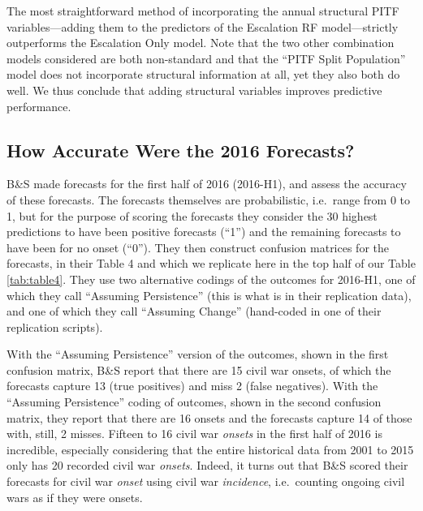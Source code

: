 \documentclass[
]{article}
\begin{document}
The most straightforward method of incorporating the annual structural PITF variables---adding them to the predictors of the Escalation RF model---strictly outperforms the Escalation Only model. Note that the two other combination models considered are both non-standard and that the ``PITF Split Population'' model does not incorporate structural information at all, yet they also both do well. We thus conclude that adding structural variables improves predictive performance.

\hypertarget{how-accurate-were-the-2016-forecasts}{%
\subsection{How Accurate Were the 2016 Forecasts?}\label{how-accurate-were-the-2016-forecasts}}

B\&S made forecasts for the first half of 2016 (2016-H1), and assess the accuracy of these forecasts. The forecasts themselves are probabilistic, i.e.~range from 0 to 1, but for the purpose of scoring the forecasts they consider the 30 highest predictions to have been positive forecasts (``1'') and the remaining forecasts to have been for no onset (``0''). They then construct confusion matrices for the forecasts, in their Table 4 and which we replicate here in the top half of our Table \ref{tab:table4}. They use two alternative codings of the outcomes for 2016-H1, one of which they call ``Assuming Persistence'' (this is what is in their replication data), and one of which they call ``Assuming Change'' (hand-coded in one of their replication scripts).

With the ``Assuming Persistence'' version of the outcomes, shown in the first confusion matrix, B\&S report that there are 15 civil war onsets, of which the forecasts capture 13 (true positives) and miss 2 (false negatives). With the ``Assuming Persistence'' coding of outcomes, shown in the second confusion matrix, they report that there are 16 onsets and the forecasts capture 14 of those with, still, 2 misses. Fifteen to 16 civil war \emph{onsets} in the first half of 2016 is incredible, especially considering that the entire historical data from 2001 to 2015 only has 20 recorded civil war \emph{onsets}. Indeed, it turns out that B\&S scored their forecasts for civil war \textit{onset} using civil war \textit{incidence}, i.e.~counting ongoing civil wars as if they were onsets.
\end{document}
